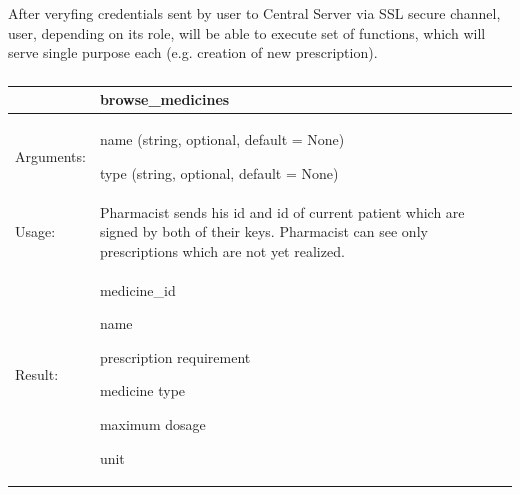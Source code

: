 \chapter{}

\section{}
After veryfing credentials sent by user to Central Server via SSL secure channel, user, depending on its role, will be able to execute set of functions, which will serve single purpose each (e.g. creation of new prescription).

\subsection{}
\small
    \begin{longtable}{| p{3cm} | p{10.75cm} |}
    \hline
     & browse\_medicines \\ \hline
    Arguments: &  \begin{packed_enum}
    \item name (string, optional, default = None)
    \item type (string, optional, default = None)
	\end{packed_enum}        \\ \hline
    Usage: & Pharmacist sends his id and id of current patient which are signed by both of their keys. Pharmacist can see only prescriptions which are not yet realized. \\ \hline
    Result: & \begin{packed_enum}
    	\item medicine\_id
    	\item name
    	\item prescription requirement
    	\item medicine type
    	\item maximum dosage
    	\item unit
	\end{packed_enum}     \\ \hline	
    \end{longtable}

